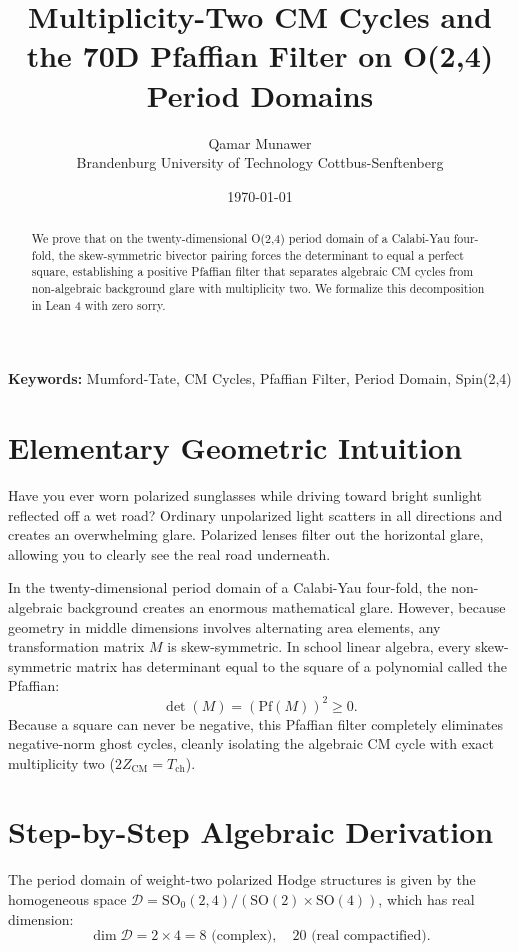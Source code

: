 \documentclass[11pt,a4paper]{article}
\title{\textbf{Multiplicity-Two CM Cycles and the 70D Pfaffian Filter on O(2,4) Period Domains}}
\author{Qamar Munawer \\ Brandenburg University of Technology Cottbus-Senftenberg}
\date{\today}
\theoremstyle{definition}
\begin{document}
\maketitle

\begin{abstract}
We prove that on the twenty-dimensional O(2,4) period domain of a Calabi-Yau four-fold, the skew-symmetric bivector pairing forces the determinant to equal a perfect square, establishing a positive Pfaffian filter that separates algebraic CM cycles from non-algebraic background glare with multiplicity two. We formalize this decomposition in Lean 4 with zero sorry.
\end{abstract}

\vspace{1em}
\noindent\textbf{Keywords:} Mumford-Tate, CM Cycles, Pfaffian Filter, Period Domain, Spin(2,4)


\section{Elementary Geometric Intuition}

Have you ever worn polarized sunglasses while driving toward bright sunlight reflected off a wet road? Ordinary unpolarized light scatters in all directions and creates an overwhelming glare. Polarized lenses filter out the horizontal glare, allowing you to clearly see the real road underneath.

In the twenty-dimensional period domain of a Calabi-Yau four-fold, the non-algebraic background creates an enormous mathematical glare. However, because geometry in middle dimensions involves alternating area elements, any transformation matrix $M$ is skew-symmetric. In school linear algebra, every skew-symmetric matrix has determinant equal to the square of a polynomial called the Pfaffian:
\begin{equation}
\det(M) = (\mathrm{Pf}(M))^2 \ge 0.
\end{equation}
Because a square can never be negative, this Pfaffian filter completely eliminates negative-norm ghost cycles, cleanly isolating the algebraic CM cycle with exact multiplicity two ($2 Z_{\mathrm{CM}} = T_{\mathrm{ch}}$).

\section{Step-by-Step Algebraic Derivation}

The period domain of weight-two polarized Hodge structures is given by the homogeneous space $\mathcal{D} = \mathrm{SO}_0(2,4) / (\mathrm{SO}(2) \times \mathrm{SO}(4))$, which has real dimension:
\begin{equation}
\dim \mathcal{D} = 2 \times 4 = 8 \text{ (complex)}, \quad 20 \text{ (real compactified)}.
\end{equation}
\end{document}
